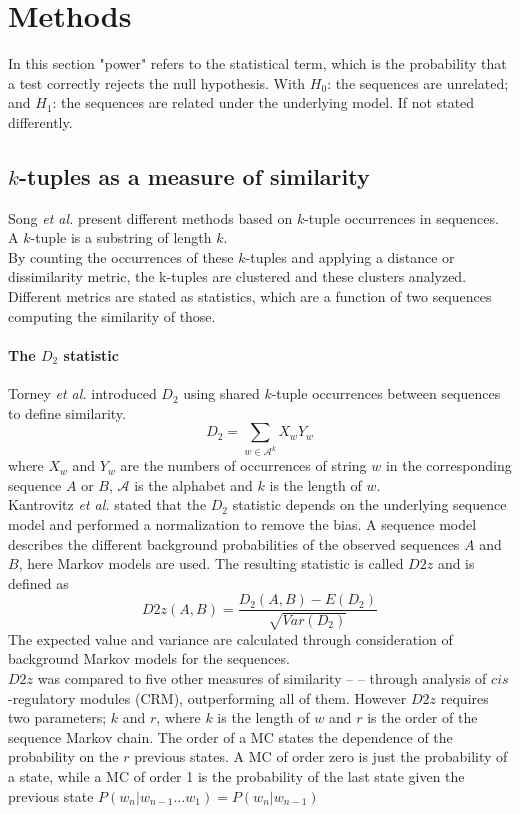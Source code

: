 \documentclass[twocolumn]{bmcart}%
\begin{document}
\section*{Methods}
In this section "power" refers to the statistical term, which is the probability that a test correctly rejects the null hypothesis. With $H_0$: the sequences are unrelated; and $H_1$: the sequences are related under the underlying model. If not stated differently.
\subsection*{$k$-tuples as a measure of similarity}
Song \textit{et al.}\cite{doi:10.1093/bib/bbt067} present different methods based on $k$-tuple occurrences in sequences. A $k$-tuple is a substring of length $k$.\\
By counting the occurrences of these $k$-tuples and applying a distance or dissimilarity metric, the k-tuples are clustered and these clusters analyzed. Different metrics are stated as statistics, which are a function of two sequences computing the similarity of those.\\
\paragraph*{The $D_2$ statistic}
Torney \textit{et al.}\cite{torney1990computation} introduced $D_2$  using shared $k$-tuple  occurrences between sequences to define similarity.
$$D_2=\sum_{w\in \mathcal{A}^k}X_wY_w$$
where $X_w$ and $Y_w$ are the numbers of occurrences of string $w$ in the corresponding sequence $A$ or $B$, $ \mathcal{A}$ is the alphabet and $k$ is the length of $w$.\\
Kantrovitz \textit{et al.}\cite{kantorovitz2007statistical} stated that the $D_2$ statistic depends on the  underlying sequence model and performed a normalization to remove the bias. A sequence model describes the different background probabilities of the observed sequences $A$ and $B$, here Markov models are used.
The resulting statistic is called $D2z$ and is defined as
$$D2z(A,B)=\frac{D_2(A,B)-E(D_2)}{\sqrt{Var(D_2)}}$$
The expected value and variance are calculated through consideration of background Markov models for the sequences.\\
$D2z$ was compared to five other measures of similarity -- \cite{doi:10.1093/bib/bbt067,kantorovitz2007statistical} -- through analysis of $cis$-regulatory modules (CRM), outperforming all of them. However $D2z$ requires two parameters; $k$ and $r$, where $k$ is the length of $w$ and $r$ is the order of the sequence Markov chain. The order of a MC states the dependence of the probability on the $r$ previous states. A MC of order zero is just the probability of a state, while a MC of order 1 is the probability of the last state given the previous state $P(w_n|w_{n-1}\dots w_1)=P(w_n|w_{n-1})$\\
\end{document}
